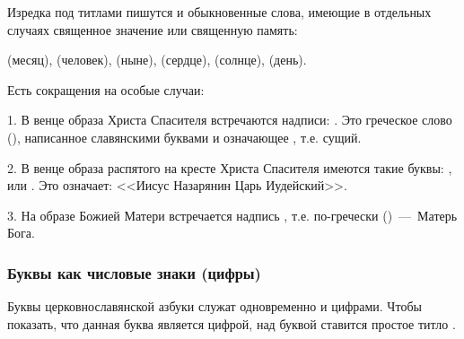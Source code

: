 \documentclass[11pt,a4paper,oneside]{memoir}
\begin{document}
    \bigskip{}

    Изредка под титлами пишутся и обыкновенные слова, имеющие в отдельных случаях священное значение или священную память:
    
    {} (месяц), {} (человек), {} (ныне), {} (сердце), {} (солнце), {} (день).
    
    Есть сокращения на особые случаи:
    
    1. В венце образа Христа Спасителя встречаются надписи: {}. Это греческое слово (), написанное славянскими буквами и означающее {}, т.е. сущий.
    
    2. В венце образа распятого на кресте Христа Спасителя имеются такие буквы: {}, или {}. Это означает: <<Иисус Назарянин Царь Иудейский>>.
    
    3. На образе Божией Матери встречается надпись {}, т.е. по-гречески ()~---~Матерь Бога.
        
                \subsubsection{Буквы как числовые знаки (цифры)}

    Буквы церковнославянской азбуки служат одновременно и цифрами. Чтобы показать, что данная буква является цифрой, над буквой ставится простое титло {}.
\end{document}
